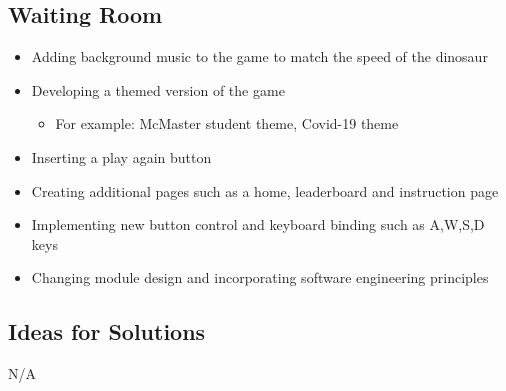 \documentclass[12pt]{article}
\begin{document}
\subsection{Waiting Room}
\begin{itemize}
 \item Adding background music to the game to match the speed of the dinosaur
 \item Developing a themed version of the game 
 \begin{itemize}
     \item For example: McMaster student theme, Covid-19 theme
 \end{itemize}
 \item Inserting a play again button
 \item Creating additional pages such as a home, leaderboard and  instruction page 
 \item Implementing new button control and keyboard binding such as A,W,S,D keys
 \item Changing module design and incorporating software engineering principles
\end{itemize}
\subsection{Ideas for Solutions}
N/A
\end{document}
